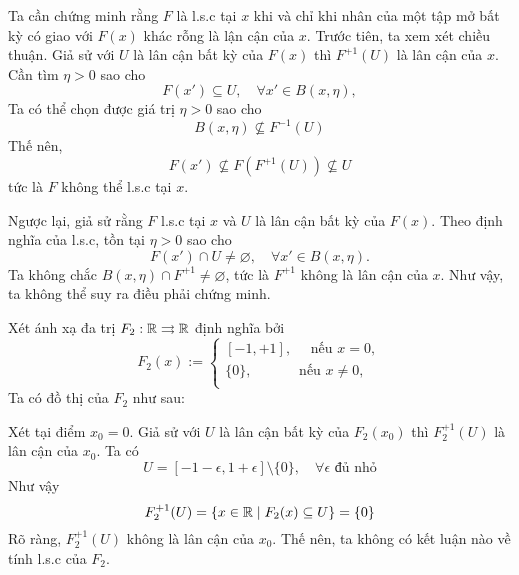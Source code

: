 \documentclass{article}
\begin{document}
\begin{remark}
    Ta cần chứng minh rằng $F$ là l.s.c tại $x$ khi và chỉ khi nhân của một tập mở bất kỳ có giao với $F(x)$ khác rỗng là lận cận của $x$. Trước tiên, ta xem xét chiều thuận. Giả sử với $U$ là lân cận bất kỳ của $F(x)$ thì $F^{+1}(U)$ là lân cận của $x$. Cần tìm $\eta > 0$ sao cho 
    \begin{equation}
        F(x') \subseteq U, \quad\forall x' \in B(x, \eta),
    \end{equation}
    Ta có thể chọn được giá trị $\eta > 0$ sao cho
    \begin{equation}
        B(x, \eta) \nsubseteq F^{-1}(U)
    \end{equation}
    Thế nên,
    \begin{equation}
        F(x') \nsubseteq F(F^{+1}(U)) \nsubseteq U
    \end{equation}
    tức là $F$ không thể l.s.c tại $x$.

    Ngược lại, giả sử rằng $F$ l.s.c tại $x$ và $U$ là lân cận bất kỳ của $F(x)$. Theo định nghĩa của l.s.c, tồn tại $\eta > 0$ sao cho
    \begin{equation}
        F(x') \cap U \ne \varnothing,\quad \forall x' \in B(x, \eta).
    \end{equation}
    Ta không chắc $B(x, \eta) \cap F^{+1} \ne \varnothing$, tức là $F^{+1}$ không là lân cận của $x$. Như vậy, ta không thể suy ra điều phải chứng minh.
\end{remark}

\begin{example}
    Xét ánh xạ đa trị $F_2: \mathbb{R} \rightrightarrows \mathbb{R}$ định nghĩa bởi
    \begin{equation}
        F_2(x) := \begin{cases}
            [-1, +1],\quad\text{ nếu } x = 0,\\
            \{0\},\quad\quad\quad\text{ nếu } x \ne 0,\\
        \end{cases}
    \end{equation}
    Ta có đồ thị của $F_2$ như sau:
    \begin{figure}[H]
        \centering
        
        \label{fig:f1}
    \end{figure}
    Xét tại điểm $x_0 = 0$. Giả sử với $U$ là lân cận bất kỳ của $F_2(x_0)$ thì $F_2^{+1}(U)$ là lân cận của $x_0$. Ta có
    \begin{equation}
        U = [-1 - \epsilon, 1 + \epsilon] \setminus \{0\}, \quad\forall \epsilon \text{ đủ nhỏ}
    \end{equation}
    Như vậy
    \begin{equation}
        F_2^{+1}(U) = \{x \in \mathbb{R} \mid F_2(x) \subseteq U\} = \{0\}
    \end{equation}
    Rõ ràng, $F_2^{+1}(U)$ không là lân cận của $x_0$. Thế nên, ta không có kết luận nào về tính l.s.c của $F_2$.
\end{example}
\end{document}
